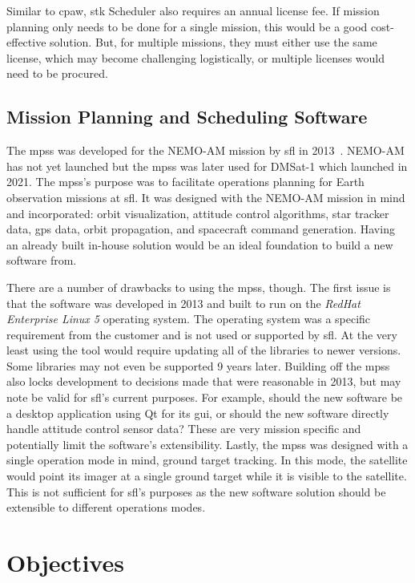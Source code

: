 Similar to \gls{cpaw}, \gls{stk} Scheduler also requires an annual license fee.
If mission planning only needs to be done for a single mission, this would be a
good cost-effective solution. But, for multiple missions, they must either use
the same license, which may become challenging logistically, or multiple
licenses would need to be procured.


\subsection{Mission Planning and Scheduling Software}

The \gls{mpss} was developed for the NEMO-AM mission by \gls{sfl} in
2013~\cite{mehradnia_design_2013}. NEMO-AM has not yet launched but the
\gls{mpss} was later used for DMSat-1 which launched in 2021. The \gls{mpss}'s
purpose was to facilitate operations planning for Earth observation missions at
\gls{sfl}.  It was designed with the NEMO-AM mission in mind and incorporated:
orbit visualization, attitude control algorithms, star tracker data, \gls{gps}
data, orbit propagation, and spacecraft command generation.  Having an already
built in-house solution would be an ideal foundation to build a new software
from. 

There are a number of drawbacks to using the \gls{mpss}, though. The first
issue is that the software was developed in 2013 and built to run on the
\textit{RedHat Enterprise Linux 5} operating system. The operating system was a
specific requirement from the customer and is not used or supported by
\gls{sfl}. At the very least using the tool would require updating all of the
libraries to newer versions. Some libraries may not even be supported 9 years
later. Building off the \gls{mpss} also locks development to decisions made
that were reasonable in 2013, but may note be valid for \gls{sfl}'s current
purposes.  For example, should the new software be a desktop application using
Qt for its \gls{gui}, or should the new software directly handle attitude
control sensor data? These are very mission specific and potentially limit the
software's extensibility. Lastly, the \gls{mpss} was designed with a single
operation mode in mind, ground target tracking. In this mode, the satellite
would point its imager at a single ground target while it is visible to the
satellite. This is not sufficient for \gls{sfl}'s purposes as the new software
solution should be extensible to different operations modes.    


\section{Objectives}

